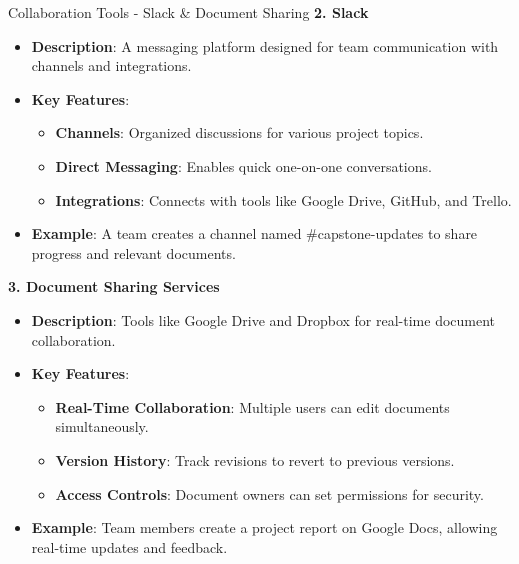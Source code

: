 \documentclass[aspectratio=169]{beamer}
\begin{document}
\begin{frame}[fragile]{Collaboration Tools - Slack \& Document Sharing}
  \textbf{2. Slack}  
  \begin{itemize}
    \item \textbf{Description}: A messaging platform designed for team communication with channels and integrations.
    \item \textbf{Key Features}:
    \begin{itemize}
      \item \textbf{Channels}: Organized discussions for various project topics.
      \item \textbf{Direct Messaging}: Enables quick one-on-one conversations.
      \item \textbf{Integrations}: Connects with tools like Google Drive, GitHub, and Trello.
    \end{itemize}
    \item \textbf{Example}: A team creates a channel named \#capstone-updates to share progress and relevant documents.
  \end{itemize}

  \vspace{1em}  

  \textbf{3. Document Sharing Services}
  \begin{itemize}
    \item \textbf{Description}: Tools like Google Drive and Dropbox for real-time document collaboration.
    \item \textbf{Key Features}:
    \begin{itemize}
      \item \textbf{Real-Time Collaboration}: Multiple users can edit documents simultaneously.
      \item \textbf{Version History}: Track revisions to revert to previous versions.
      \item \textbf{Access Controls}: Document owners can set permissions for security.
    \end{itemize}
    \item \textbf{Example}: Team members create a project report on Google Docs, allowing real-time updates and feedback.
  \end{itemize}
\end{frame}
\end{document}

